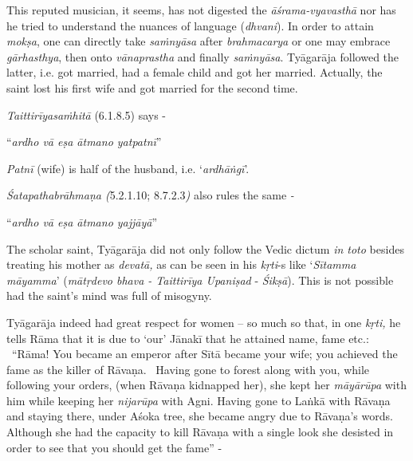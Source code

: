 This reputed musician, it seems, has not digested the \textit{āśrama-vyavasthā} nor has he tried to understand the nuances of language (\textit{dhvani}). In order to attain \textit{mokṣa}, one can directly take \textit{saṁnyāsa} after \textit{brahmacarya} or one may embrace \textit{gārhasthya}, then onto \textit{vānaprastha} and finally \textit{saṁnyāsa}. Tyāgarāja followed the latter, i.e. got married, had a female child and got her married. Actually, the saint lost his first wife and got married for the second time.

\textit{Taittirīyasaṁhitā} (6.1.8.5) says -

\begin{centerquote}
“\textit{ardho vā eṣa ātmano yatpatnī}”
\end{centerquote}

\textit{Patnī} (wife) is half of the husband, i.e. ‘\textit{ardhāṅgī}’.

\textit{Śatapathabrāhmaṇa (}5.2.1.10; 8.7.2.3\textit{)} also rules the same \textit{-}

\begin{centerquote}
“\textit{ardho vā eṣa ātmano yajjāyā}”
\end{centerquote}

The scholar saint, Tyāgarāja did not only follow the Vedic dictum \textit{in toto} besides treating his mother as \textit{devatā,} as can be seen in his \textit{kṛti}-s like ‘\textit{Sītamma māyamma}’ (\textit{mātṛdevo bhava - Taittirīya Upaniṣad} - \textit{Śikṣā}). This is not possible had the saint’s mind was full of misogyny.

\newpage

Tyāgarāja indeed had great respect for women – so much so that, in one \textit{kṛti,} he tells Rāma that it is due to ‘our’ Jānakī that he attained name, fame etc.:  “Rāma! You became an emperor after Sītā became your wife; you achieved the fame as the killer of Rāvaṇa.  Having gone to forest along with you, while following your orders, (when Rāvaṇa kidnapped her), she kept her \textit{māyārūpa} with him while keeping her \textit{nijarūpa} with Agni. Having gone to Laṅkā with Rāvaṇa and staying there, under Aśoka tree, she became angry due to Rāvaṇa’s words. Although she had the capacity to kill Rāvaṇa with a single look she desisted in order to see that you should get the fame” -

